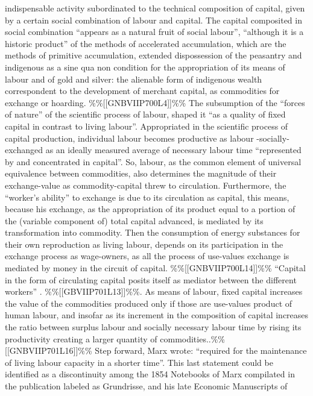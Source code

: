 \documentclass[
]{article}
\begin{document}
indispensable activity subordinated to the technical composition of
capital, given by a certain social combination of labour and capital.
The capital composited in social combination ``appears as a natural
fruit of social labour'', ``although it is a historic product'' of the
methods of accelerated accumulation, which are the methods of primitive
accumulation, extended dispossession of the peasantry and indigenous as
a sine qua non condition for the appropriation of its means of labour
and of gold and silver: the alienable form of indigenous wealth
correspondent to the development of merchant capital, as commodities for
exchange or hoarding. \%\%{[}{[}GNBVIIP700L4{]}{]}\%\% The subsumption
of the ``forces of nature'' of the scientific process of labour, shaped
it ``as a quality of fixed capital in contrast to living labour''.
Appropriated in the scientific process of capital production, individual
labour becomes productive as labour -socially- exchanged as an ideally
measured average of necessary labour time ``represented by and
concentrated in capital''. So, labour, as the common element of
universal equivalence between commodities, also determines the magnitude
of their exchange-value as commodity-capital threw to circulation.
Furthermore, the ``worker's ability'' to exchange is due to its
circulation as capital, this means, because his exchange, as the
appropriation of its product equal to a portion of the (variable
component of) total capital advanced, is mediated by its transformation
into commodity. Then the consumption of energy substances for their own
reproduction as living labour, depends on its participation in the
exchange process as wage-owners, as all the process of use-values
exchange is mediated by money in the circuit of capital.
\%\%{[}{[}GNBVIIP700L14{]}{]}\%\% ``Capital in the form of circulating
capital posits itself as mediator between the different workers'' .
\%\%{[}{[}GBVIIP701L13{]}{]}\%\%. As means of labour, fixed capital
increases the value of the commodities produced only if those are
use-values product of human labour, and insofar as its increment in the
composition of capital increases the ratio between surplus labour and
socially necessary labour time by rising its productivity creating a
larger quantity of commodities..\%\%{[}{[}GNBVIIP701L16{]}{]}\%\% Step
forward, Marx wrote: ``required for the maintenance of living labour
capacity in a shorter time''. This last statement could be identified as
a discontinuity among the 1854 Notebooks of Marx compilated in the
publication labeled as Grundrisse, and his late Economic Manuscripts of
\end{document}
